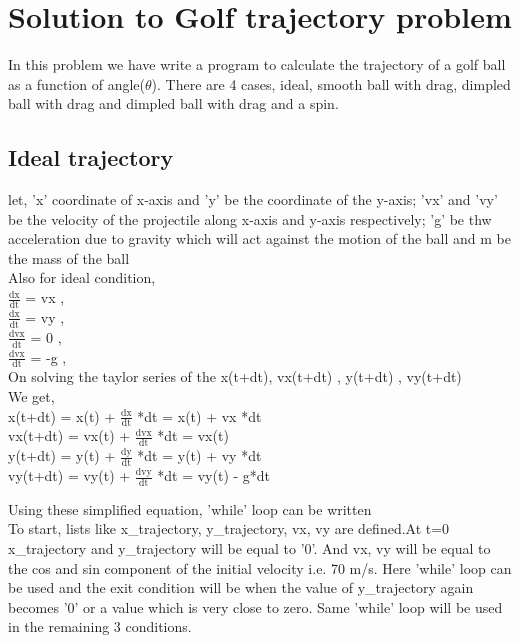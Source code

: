 \documentclass[11pt]{article}
\begin{document}
\section{Solution to Golf trajectory problem}
In this problem we have write a program to calculate the trajectory of a golf ball as a function of angle($\theta$). There are 4 cases, ideal, smooth ball with drag, dimpled ball with drag and dimpled ball with drag and a spin.
\subsection{Ideal trajectory}
\begin{raggedright}
let, 'x' coordinate of x-axis and 'y' be the coordinate of the y-axis; 'vx' and 'vy' be the velocity of the projectile along x-axis and y-axis respectively; 'g' be thw acceleration due to gravity which will act against the motion of the ball and m be the mass of the ball\\
Also for ideal condition,\\
$\frac{\text{dx}}{\text{dt}}$ = vx , \\
$\frac{\text{dx}}{\text{dt}}$ = vy , \\
$\frac{\text{dvx}}{\text{dt}}$ = 0 , \\
$\frac{\text{dvx}}{\text{dt}}$ = -g , \\
On solving the taylor series of the x(t+dt), vx(t+dt) , y(t+dt) , vy(t+dt)\\
We get,\\
x(t+dt) = x(t) + $\frac{\text{dx}}{\text{dt}}$ *dt = x(t) + vx *dt\\
vx(t+dt) = vx(t) + $\frac{\text{dvx}}{\text{dt}}$ *dt = vx(t)\\
y(t+dt) = y(t) + $\frac{\text{dy}}{\text{dt}}$ *dt = y(t) + vy *dt\\
vy(t+dt) = vy(t) + $\frac{\text{dvy}}{\text{dt}}$ *dt = vy(t) - g*dt\\

\end{raggedright}

\begin{raggedright}
\begin{justify}
Using these simplified equation, 'while' loop can be written\\
To start, lists like x\_trajectory, y\_trajectory, vx, vy are defined.At t=0 x\_trajectory and y\_trajectory will be equal to '0'. And vx, vy will be equal to the cos and sin component of the initial velocity i.e. 70 m/s. Here 'while' loop can be used and the exit condition will be when the value of y\_trajectory again becomes '0' or a value which is very close to zero. Same 'while' loop will be used in the remaining 3 conditions.
\end{justify}
\end{raggedright}
\end{document}

